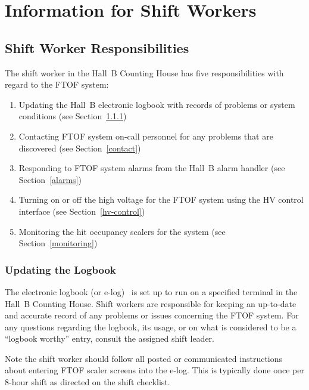 \documentclass[12pt]{article}
\begin{document}
\clearpage

\vfil
\eject

\section{Information for Shift Workers}

\subsection{Shift Worker Responsibilities}

The shift worker in the Hall~B Counting House has five responsibilities with regard to 
the FTOF system:

\begin{enumerate}
\item Updating the Hall~B electronic logbook with records of problems or system 
conditions (see Section~\ref{logbook})

\item Contacting FTOF system on-call personnel for any problems that are discovered 
(see Section~\ref{contact})

\item Responding to FTOF system alarms from the Hall~B alarm handler (see 
Section~\ref{alarms})

\item Turning on or off the high voltage for the FTOF system using the HV control 
interface (see Section~\ref{hv-control})

\item Monitoring the hit occupancy scalers for the system (see Section~\ref{monitoring})
\end{enumerate}

\subsubsection{Updating the Logbook}
\label{logbook}

The electronic logbook (or e-log)~\cite{e-log} is set up to run on a specified terminal 
in the Hall~B Counting House. Shift workers are responsible for keeping an up-to-date 
and accurate record of any problems or issues concerning the FTOF system. For any 
questions regarding the logbook, its usage, or on what is considered to be a ``logbook 
worthy'' entry, consult the assigned shift leader.

Note the shift worker should follow all posted or communicated instructions about 
entering FTOF scaler screens into the e-log. This is typically done once per 8-hour 
shift as directed on the shift checklist.
\end{document}
